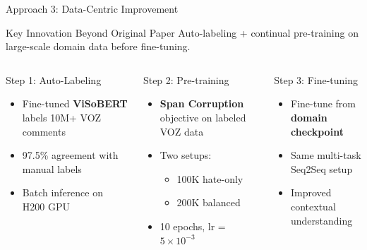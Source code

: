 \documentclass[10pt, aspectratio=169]{beamer}
\begin{document}
\begin{frame}[shrink=12]{Approach 3: Data-Centric Improvement}
  \begin{block}{Key Innovation Beyond Original Paper}
    Auto-labeling + continual pre-training on large-scale domain data before fine-tuning.
  \end{block}
  \vspace{0.2cm}

  \begin{columns}[T]
    \begin{block}{\small Step 1: Auto-Labeling}
      \begin{itemize}
        \item Fine-tuned \textbf{ViSoBERT} labels 10M+ VOZ comments
        \item 97.5\% agreement with manual labels
        \item Batch inference on H200 GPU
      \end{itemize}
    \end{block}

    \begin{block}{\small Step 2: Pre-training}
      \begin{itemize}
        \item \textbf{Span Corruption} objective on labeled VOZ data
        \item Two setups:
          \begin{itemize}
            \item 100K hate-only
            \item 200K balanced
          \end{itemize}
        \item 10 epochs, lr = $5 \times 10^{-3}$
      \end{itemize}
    \end{block}

    \begin{block}{\small Step 3: Fine-tuning}
      \begin{itemize}
        \item Fine-tune from \textbf{domain checkpoint}
        \item Same multi-task Seq2Seq setup
        \item Improved contextual understanding
      \end{itemize}
    \end{block}
  \end{columns}


\end{frame}
\end{document}
